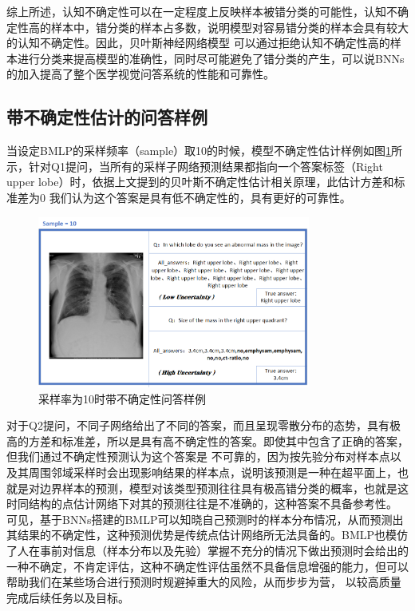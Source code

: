 综上所述，认知不确定性可以在一定程度上反映样本被错分类的可能性，认知不确定性高的样本中，错分类的样本占多数，说明模型对容易错分类的样本会具有较大的认知不确定性。因此，贝叶斯神经网络模型
可以通过拒绝认知不确定性高的样本进行分类来提高模型的准确性，同时尽可能避免了错分类的产生，可以说BNNs的加入提高了整个医学视觉问答系统的性能和可靠性。

\subsection{带不确定性估计的问答样例}
当设定BMLP的采样频率（sample）取10的时候，模型不确定性估计样例如图\ref{qademo}所示，针对Q1提问，当所有的采样子网络预测结果都指向一个答案标签（Right upper lobe）时，依据上文提到的贝叶斯不确定性估计相关原理\cite{blundell2015weight}，此估计方差和标准差为0
我们认为这个答案是具有低不确定性的，具有更好的可靠性。
\begin{figure}[htbp]
	\centering	
	\includegraphics[width=0.8\textwidth]{Fig/myfig/chapter4/qadamo.png}  %
	\caption{\label{qademo}采样率为10时带不确定性问答样例} 
\end{figure}

对于Q2提问，不同子网络给出了不同的答案，而且呈现零散分布的态势，具有极高的方差和标准差，所以是具有高不确定性的答案。即使其中包含了正确的答案，但我们通过不确定性预测认为这个答案是
不可靠的，因为按先验分布对样本点以及其周围邻域采样时会出现影响结果的样本点，说明该预测是一种在超平面上，也就是对边界样本的预测，模型对该类型预测往往具有极高错分类的概率，也就是这时同结构的点估计网络下对其的预测往往是不准确的，这种答案不具备参考性。
可见，基于BNNs搭建的BMLP可以知晓自己预测时的样本分布情况，从而预测出其结果的不确定性，这种预测优势是传统点估计网络所无法具备的。BMLP也模仿了人在事前对信息（样本分布以及先验）掌握不充分的情况下做出预测时会给出的一种不确定，不肯定评估，这种不确定性评估虽然不具备信息增强的能力，但可以帮助我们在某些场合进行预测时规避掉重大的风险，从而步步为营，
以较高质量完成后续任务以及目标。


